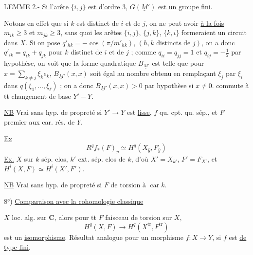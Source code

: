 LEMME 2.- \uline{Si l'arête} $\{i,j\}$ \uline{est d'ordre} 3, $G(\underline M')$ \uline{est un groupe fini}.

Notons en effet que si $k$ est distinct de $i$ et de $j$, on ne peut avoir \uline{à la fois} $m_{ik}\geq3$ et $m_{jk}\geq3$, sans quoi les arêtes $\{i,j\}$, $\{j,k\}$, $\{k,i\}$ formeraient un circuit dans $X$. Si on pose $q'_{hk}=-\cos(\pi/m'_{hk})$, $(h,k\text{ distincts de }j)$, on a donc $q'_{ik}=q_{ik}+q_{jk}$ pour $k$ distinct de $i$ et de $j$ ; comme $q_{ii}=q_{jj}=1$ et $q_{ij}=-\frac12$ par hypothèse, on voit que la forme quadratique $B_{\underline M'}$ est telle que pour $\displaystyle x=\sum_{k\ne j}\xi_ke_k$, $B_{\underline M'}(x,x)$ soit égal au nombre obtenu en remplaçant $\xi_j$ par $\xi_i$ dans $q(\xi_1,\ldots,\xi_\ell)$ ; on a donc $B_{\underline M'}(x,x)>0$ par hypothèse si $x\ne0$.
commute à tt changement de base $Y'-Y$.

\uline{NB} Vrai sans hyp. de propreté si $Y'\to Y$ est \uline{lisse}, $f$ qu. cpt. qu. sép., et $F$ premier aux car. rés. de $Y$.


\uline{Ex}
\[
R^qf_*(F)_{\bar y}\simeq H^q(X_{\bar y},F_{\bar y})
\]
\uline{Ex.} $X$  sur $k$ sép. clos, $k'$ ext. sép. clos de $k$, d'où $X'=X_{k'}$, $F'=F_{X'}$, et $H^i(X,F)\simeq H^i(X',F')$.

\uline{NB} Vrai sans hyp. de propreté si $F$ de torsion  à  $\operatorname{car} k$.

8°) \uline{Comparaison avec la cohomologie classique}

$X$  loc. alg. sur $\mathbf C$, alors pour tt $F$ faisceau de torsion sur $X$,
\[
H^q(X,F)\longrightarrow H^q(X^{\mathrm{tr}},F^{\mathrm{tr}})
\]
est un \uline{isomorphisme}. Résultat analogue pour un morphisme $f:X\longrightarrow Y$, si $f$ est  \uline{de type fini}.




